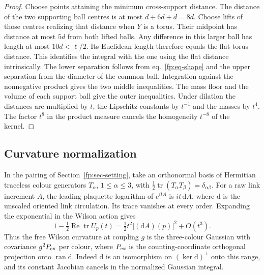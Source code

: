 \documentclass[11pt,letterpaper,reqno]{amsart}
\numberwithin{equation}{section}
\renewcommand{\eqref}[1]{\textup{eq.~\ref{#1}}}
\theoremstyle{definition}
\theoremstyle{remark}
\begin{document}
\begin{proof}
Choose points attaining the minimum cross-support distance. The
distance of the two supporting ball centres is at most \(d+6d+d=8d\).
Choose lifts of those centres realizing that distance when \(Y\)
is a torus. Their midpoint has distance at most \(5d\) from both
lifted balls. Any difference in this larger ball has length at
most \(10d<\ell/2\). Its Euclidean length therefore equals the
flat torus distance. This identifies the integral with the one
using the flat distance intrinsically. The lower separation follows
from \eqref{fp:eq-shape} and the upper separation from the diameter
of the common ball. Integration against the nonnegative product
gives the two middle inequalities. The mass floor and the volume
of each support ball give the outer inequalities. Under dilation
the distances are multiplied by \(t\), the Lipschitz constants by
\(t^{-1}\) and the masses by \(t^4\). The factor \(t^8\) in the
product measure cancels the homogeneity \(t^{-8}\) of the kernel.
\end{proof}

\subsection{Curvature normalization}

In the pairing of Section~\ref{fp:sec-setting}, take an orthonormal basis
of Hermitian traceless colour generators \(T_\alpha\),
\(1\le\alpha\le3\), with
\(\tfrac12\operatorname{tr}(T_\alpha T_\beta)=\delta_{\alpha\beta}\).
For a raw link increment \(A\), the leading plaquette logarithm
of \(e^{itA}\) is \(it\,\mathrm d A\), where \(\mathrm d\) is the
unscaled oriented link circulation. Its trace vanishes at every
order. Expanding the exponential in the Wilson action gives
\[
 1-\tfrac12\operatorname{Re}\operatorname{tr}U_p(t)
   =\tfrac12 t^2|(\mathrm dA)(p)|^2+O(t^3).
\]
Thus the free Wilson curvature at coupling \(g\) is the
three-colour Gaussian with covariance \(g^2P_{\rm ex}\) per
colour, where \(P_{\rm ex}\) is the counting-coordinate
orthogonal projection onto \(\operatorname{ran}\mathrm d\).
Indeed \(\mathrm d\) is an isomorphism on
\((\ker\mathrm d)^\perp\) onto this range, and its constant
Jacobian cancels in the normalized Gaussian integral.
\end{document}
